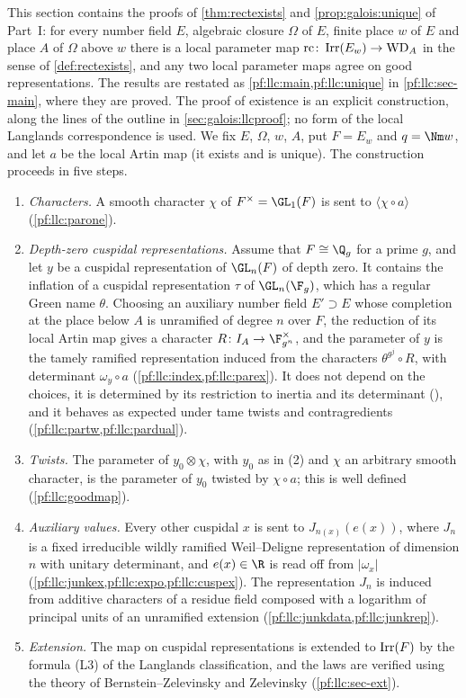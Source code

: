 This section contains the proofs of \cref{thm:rectexists} and \cref{prop:galois:unique} of Part~I:
for every number field $E$, algebraic closure $\Omega$ of $E$, finite place $w$ of $E$ and place $A$
of $\Omega$ above $w$ there is a local parameter map $\mathrm{rc}\colon\operatorname{Irr}(E_w)\to\mathrm{WD}_A$ in the sense
of \cref{def:rectexists}, and any two local parameter maps agree on good representations. The
results are restated as \cref{pf:llc:main,pf:llc:unique} in \cref{pf:llc:sec-main}, where they are
proved. The proof of existence is an explicit construction, along the lines of the outline in
\cref{sec:galois:llcproof}; no form of the local Langlands correspondence is used. We fix $E$, $\Omega$,
$w$, $A$, put $F=E_w$ and $q=\Nm w$, and let $a$ be the local Artin map (it exists and is unique).
The construction proceeds in five steps.
\begin{enumerate}[label=(\arabic*)]
\item \emph{Characters.} A smooth character $\chi$ of $F^\times=\GL_1(F)$ is sent to
  $\langle\chi\circ a\rangle$ (\cref{pf:llc:parone}).
\item \emph{Depth-zero cuspidal representations.} Assume that $F\cong\Q_g$ for a prime $g$, and let $y$
  be a cuspidal representation of $\GL_n(F)$ of depth zero. It contains the inflation of a cuspidal
  representation $\tau$ of $\GL_n(\F_g)$, which has a regular Green name $\theta$. Choosing an auxiliary
  number field $E'\supset E$ whose completion at the place below $A$ is unramified of degree $n$ over
  $F$, the reduction of its local Artin map gives a character $R\colon I_A\to\F_{g^n}^\times$, and the
  parameter of $y$ is the tamely ramified representation induced from the characters
  $\theta^{g^j}\circ R$, with determinant $\omega_y\circ a$ (\cref{pf:llc:index,pf:llc:parex}). It
  does not depend on the choices, it is determined by its restriction to inertia and its determinant
  (), and it behaves as expected under tame twists and
  contragredients (\cref{pf:llc:partw,pf:llc:pardual}).
\item \emph{Twists.} The parameter of $y_0\otimes\chi$, with $y_0$ as in (2) and $\chi$ an arbitrary
  smooth character, is the parameter of $y_0$ twisted by $\chi\circ a$; this is well defined
  (\cref{pf:llc:goodmap}).
\item \emph{Auxiliary values.} Every other cuspidal $x$ is sent to $J_{n(x)}(e(x))$, where $J_n$ is a
  fixed irreducible wildly ramified Weil--Deligne representation of dimension $n$ with unitary
  determinant, and $e(x)\in\R$ is read off from $|\omega_x|$
  (\cref{pf:llc:junkex,pf:llc:expo,pf:llc:cuspex}). The representation $J_n$ is induced from additive
  characters of a residue field composed with a logarithm of principal units of an unramified
  extension (\cref{pf:llc:junkdata,pf:llc:junkrep}).
\item \emph{Extension.} The map on cuspidal representations is extended to $\operatorname{Irr}(F)$ by the formula
  (L3) of the Langlands classification, and the laws are verified using the theory of
  Bernstein--Zelevinsky and Zelevinsky (\cref{pf:llc:sec-ext}).
\end{enumerate}
